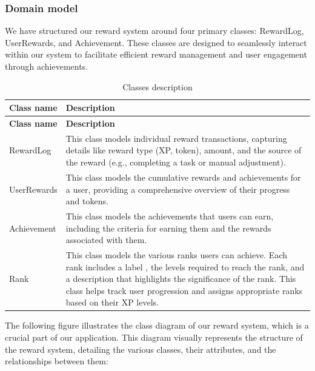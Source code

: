 \subsubsection{Domain model}
We have structured our reward system around four primary classes: RewardLog, UserRewards, and Achievement. These classes are designed to seamlessly interact within our system to facilitate efficient reward management and user engagement through achievements.
\\

\begin{longtable}{ | m{} | m{} | }
    \caption{Classes description}                                                                                                               \\
    \hline
    \textbf{Class name}    & \textbf{Description}                                                                                               \\
    \hline
    \endfirsthead
    \hline
    \textbf{Class name}    & \textbf{Description}                                                                                               \\
    \hline
    \endhead
    \endfoot
    \hline
    \endlastfoot
    RewardLog                 & This class models individual reward transactions, capturing details like  reward type (XP, token), amount, and the source of the reward (e.g., completing a task or manual adjustment). \\
    \hline
    UserRewards               & This class models the cumulative rewards and achievements for a user, providing a comprehensive overview of their progress and tokens. \\
    \hline
    Achievement              & This class models the achievements that users can earn, including the criteria for earning them and the rewards associated with them. \\
    \hline
    Rank                     & This class models the various ranks users can achieve. Each rank includes a label , the levels required to reach the rank, and a description that highlights the significance of the rank. This class helps track user progression and assigns appropriate ranks based on their XP levels. \\
    \hline
\end{longtable}
The following figure illustrates the class diagram of our reward system, which is a crucial part of our application. This diagram visually represents the structure of the reward system, detailing the various classes, their attributes, and the relationships between them:

